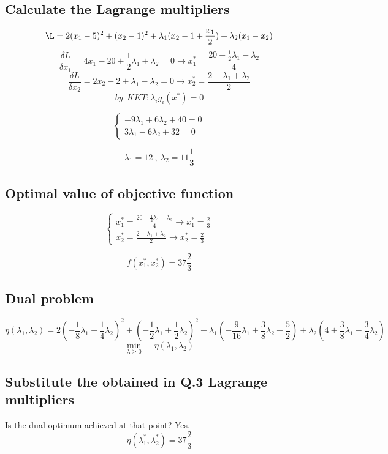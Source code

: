 \documentclass[12pt]{article}
\begin{document}
\subsection{Calculate the Lagrange multipliers}
\[\L=2(x_1-5)^2+(x_2-1)^2 +\lambda_1(x_2-1
+\frac{x_1}{2}) +\lambda_2(x_1-x_2) \]
\[\frac{\delta L}{\delta x_1} = 4 x_1 -20 + \frac{1}{2} \lambda_1 + \lambda_2 = 0 \longrightarrow x_1^* = \frac{20-\frac{1}{2}\lambda_1-\lambda_2}{4} \]
\[\frac{\delta L}{\delta x_2} = 2x_2-2+\lambda_1-\lambda_2=0 \longrightarrow x_2^*=\frac{2-\lambda_1+\lambda_2}{2} \]
\[by \ \ KKT: \lambda_i g_i(x^*)=0 \]

\[
\left\{
\begin{array}{ll}
-9\lambda_1+6\lambda_2+40=0 \\
3\lambda_1-6\lambda_2+32=0
\end{array}
\right.
\]

\[\lambda_1=12 \ , \ \lambda_2=11\frac{1}{3} \]

\subsection{Optimal value of objective function}
\[
\left\{
\begin{array}{ll}
x_1^* = \frac{20-\frac{1}{2}\lambda_1-\lambda_2}{4} \longrightarrow x_1^* = \frac{2}{3}\\
x_2^*=\frac{2-\lambda_1+\lambda_2}{2} \longrightarrow x_2^* = \frac{2}{3}
\end{array}
\right.
\]

\[f(x_1^*,x_2^*)=37 \frac{2}{3} \]

\subsection{Dual problem}
\[\eta(\lambda_1, \lambda_2) = 2(-\frac{1}{8}\lambda_1-\frac{1}{4}\lambda_2)^2 + (-\frac{1}{2}\lambda_1+\frac{1}{2}\lambda_2)^2 + \lambda_1 (-\frac{9}{16}\lambda_1 +\frac{3}{8}\lambda_2+\frac{5}{2})+\lambda_2 (4+\frac{3}{8}\lambda_1-\frac{3}{4}\lambda_2) \]
\[\min_{\lambda \geq 0} -\eta(\lambda_1, \lambda_2) \]

\subsection{Substitute the obtained in Q.3 Lagrange multipliers}
Is the dual optimum achieved at that point? Yes.
\[\eta(\lambda_1^*, \lambda_2^*) = 37 \frac{2}{3} \]
\end{document}
